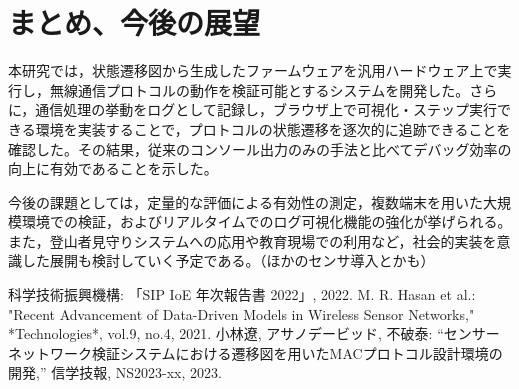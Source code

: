 \documentclass[paper]{ieicej}
\begin{document}
\section{まとめ、今後の展望}
本研究では，状態遷移図から生成したファームウェアを汎用ハードウェア上で実行し，無線通信プロトコルの動作を検証可能とするシステムを開発した。さらに，通信処理の挙動をログとして記録し，ブラウザ上で可視化・ステップ実行できる環境を実装することで，プロトコルの状態遷移を逐次的に追跡できることを確認した。その結果，従来のコンソール出力のみの手法と比べてデバッグ効率の向上に有効であることを示した。

今後の課題としては，定量的な評価による有効性の測定，複数端末を用いた大規模環境での検証，およびリアルタイムでのログ可視化機能の強化が挙げられる。また，登山者見守りシステムへの応用や教育現場での利用など，社会的実装を意識した展開も検討していく予定である。（ほかのセンサ導入とかも）


\baselineskip
%
%

\begin{thebibliography}{99}
 科学技術振興機構: 「SIP IoE 年次報告書 2022」, 2022.
 M. R. Hasan et al.: "Recent Advancement of Data-Driven Models in Wireless Sensor Networks," *Technologies*, vol.9, no.4, 2021.
 小林遼, アサノデービッド, 不破泰:
“センサーネットワーク検証システムにおける遷移図を用いたMACプロトコル設計環境の開発,”
信学技報, NS2023-xx, 2023.

\end{thebibliography}

\appendix
\section{}
\end{document}
